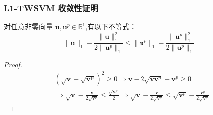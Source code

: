 \documentclass{beamer}
\begin{document}
\begin{frame}
\frametitle{L1-TWSVM 收敛性证明}
\begin{lemma}
对任意非零向量 $\mathbf{u},\mathbf{u}^p\in\mathbb{R}^1$,有以下不等式：
\begin{equation}
\|\mathbf{u}\|_{1}-\frac{\|\mathbf{u}\|^{2}_{1}}{2\|\mathbf{u}^p\|_{1}}\le
\|\mathbf{u}^p\|_{1}-\frac{\|\mathbf{u}^p\|^{2}_{1}}{2\|\mathbf{u}^p\|_{1}}
\label{yw1}
\end{equation}
\end{lemma}

\begin{proof}
\begin{equation}
\begin{aligned}
&(\sqrt{\mathbf{v}}-\sqrt{\mathbf{v^p}})^2\ge0
\Rightarrow\mathbf{v}-2\sqrt{\mathbf{vv}^p}+\mathbf{v}^p\ge0\\
&\Rightarrow\sqrt{\mathbf{v}}-\frac{\mathbf{v}}{2\sqrt{\mathbf{v}^p}}\le
\frac{\sqrt{\mathbf{v}^p}}{2}
\Rightarrow\sqrt{\mathbf{v}}-\frac{\mathbf{v}}{2\sqrt{\mathbf{v}^p}}\le
\sqrt{\mathbf{v}^p}-\frac{\mathbf{v}^p}{2\sqrt{\mathbf{v}^p}}
\end{aligned}
\label{yw2}
\end{equation}
\end{proof}
\end{frame}
\end{document}

